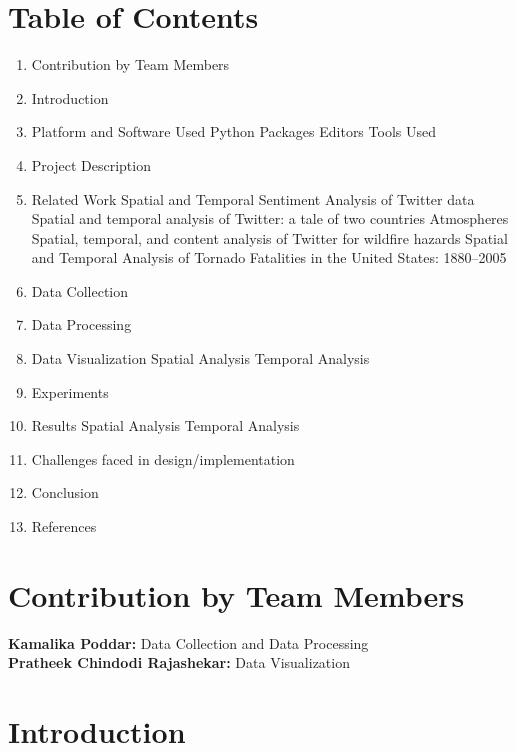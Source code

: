 \documentclass[12pt, oneside]{article}   	%
\begin{document}
\section{Table of Contents}
\begin{enumerate}
	\item Contribution by Team Members
	\item Introduction
	\item Platform and Software Used
	 Python Packages
	 Editors
	 Tools Used
	\item Project Description
	\item Related Work
	 Spatial and Temporal Sentiment Analysis of Twitter data
	 Spatial and temporal analysis of Twitter: a tale of two countries
	 Atmospheres
	 Spatial, temporal, and content analysis of Twitter for wildfire hazards
	 Spatial and Temporal Analysis of Tornado Fatalities in the United States: 1880–2005
	\item Data Collection
	\item Data Processing
	\item Data Visualization
	 Spatial Analysis
	 Temporal Analysis
	\item Experiments
	\item Results
	 Spatial Analysis
	 Temporal Analysis
	\item Challenges faced in design/implementation
	\item Conclusion
	\item References
\end{enumerate}

\section{Contribution by Team Members}
\textbf{Kamalika Poddar:} Data Collection and Data Processing\\
\textbf{Pratheek Chindodi Rajashekar:} Data Visualization\\

\section{Introduction}
\end{document}

